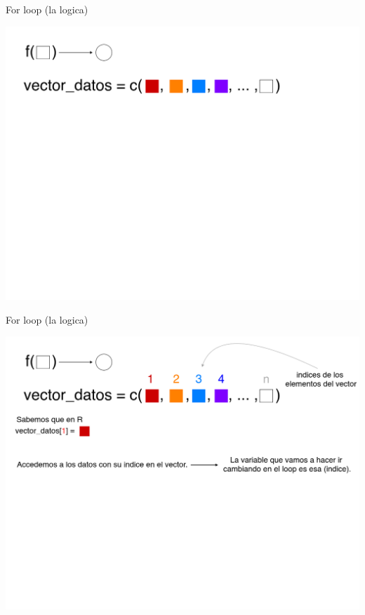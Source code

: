 \documentclass[
  10pt,
  ignorenonframetext,
]{beamer}
\begin{document}
\begin{frame}{For loop (la logica)}
\protect\hypertarget{for-loop-la-logica-1}{}
\begin{center}\includegraphics[width=0.9\linewidth]{images/explicando_forloops_en_r_0b} \end{center}
\end{frame}

\begin{frame}{For loop (la logica)}
\protect\hypertarget{for-loop-la-logica-2}{}
\begin{center}\includegraphics[width=0.9\linewidth]{images/explicando_forloops_en_r_0c} \end{center}
\end{frame}
\end{document}
